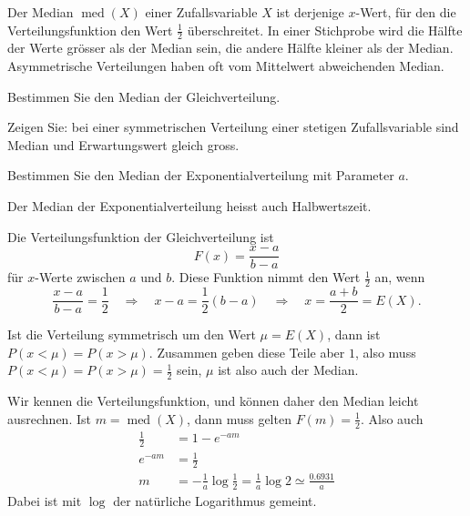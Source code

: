 Der Median $\operatorname{med}(X)$ einer Zufallsvariable $X$
ist derjenige $x$-Wert, für den die
Verteilungsfunktion den Wert $\frac12$ überschreitet. In einer
Stichprobe wird die Hälfte der Werte grösser als der Median
sein, die andere Hälfte kleiner als der Median. Asymmetrische
Verteilungen haben oft vom Mittelwert abweichenden Median.

\begin{teilaufgaben}
\item Bestimmen Sie den Median der Gleichverteilung.
\item Zeigen Sie: bei einer symmetrischen Verteilung einer
stetigen Zufallsvariable sind Median
und Erwartungswert gleich gross.
\item Bestimmen Sie den Median der Exponentialverteilung mit Parameter $a$.
\end{teilaufgaben}
Der Median der Exponentialverteilung heisst auch Halbwertszeit.

\begin{loesung}
\begin{teilaufgaben}
\item Die Verteilungsfunktion der Gleichverteilung ist
\[
F(x)=\frac{x-a}{b-a}
\]
für $x$-Werte zwischen $a$ und $b$. Diese Funktion nimmt den
Wert $\frac12$ an, wenn
\[
\frac{x-a}{b-a}=\frac12
\quad\Rightarrow\quad
x-a=\frac12(b-a)
\quad\Rightarrow\quad
x=\frac{a+b}2=E(X).
\]
\item Ist die Verteilung symmetrisch um den Wert $\mu=E(X)$, dann
ist $P(x<\mu)=P(x>\mu)$. Zusammen geben diese Teile aber $1$, also
muss $P(x<\mu)=P(x>\mu)=\frac12$ sein, $\mu$ ist also auch der Median.
\item
Wir kennen die Verteilungsfunktion, und können daher den Median
leicht ausrechnen. Ist $m=\operatorname{med}(X)$, dann muss
gelten $F(m)=\frac12$. Also auch
\begin{align*}
\frac12&=1-e^{-am}\\
e^{-am}&=\frac12\\
m&=-\frac1a\log\frac12=\frac1a\log 2\simeq\frac{0.6931}{a}
\end{align*}
Dabei ist mit $\log$ der natürliche Logarithmus gemeint.
\qedhere
\end{teilaufgaben}
\end{loesung}

